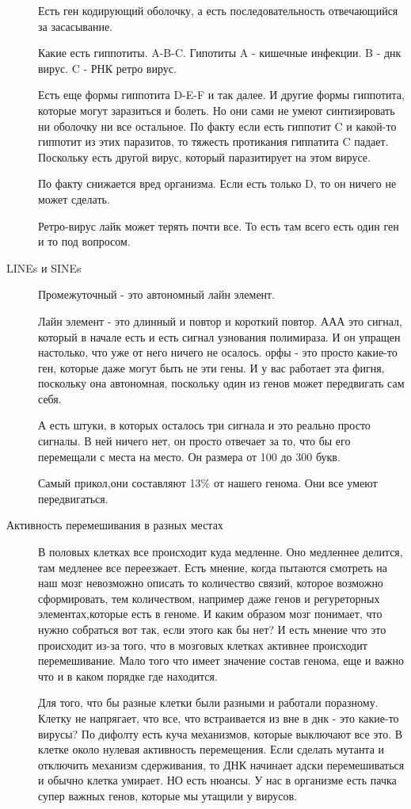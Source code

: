 \begin{description}
Есть ген кодирующий оболочку, а есть последовательность 
отвечающийся за засасывание. 


Какие есть гиппотиты. A-B-C. Гипотиты A - кишечные инфекции. B - днк вирус. C - РНК ретро вирус. 

Есть еще формы гиппотита D-E-F и так далее. И другие формы гиппотита, которые могут заразиться 
и болеть. Но они сами не умеют синтизировать ни оболочку ни все остальное. По факту если есть 
гиппотит C и какой-то гиппотит из этих паразитов, то тяжесть протикания гиппатита C падает. 
Поскольку есть другой вирус, который паразитирует на этом вирусе. 

По факту снижается вред организма. Если есть только D, то он ничего не может сделать. 

Ретро-вирус лайк может терять почти все. То есть там всего есть один ген и то 
под вопросом.

\item[LINEs и SINEs] 
Промежуточный - это автономный лайн элемент. 

Лайн элемент - это длинный и повтор
и короткий повтор. ААА это сигнал, который в начале
есть и есть сигнал узнования полимираза. И он упращен настолько,
что уже от него ничего не осалось. орфы - это просто какие-то
ген, которые даже могут быть не эти гены. И у вас работает эта фигня,
поскольку она автономная, поскольку один из генов может передвигать сам себя.

А есть штуки, в которых осталось три сигнала и это
реально просто сигналы. В ней ничего нет, он просто отвечает за то,
что бы его перемещали с места на место. Он размера от 100 до 300 букв.

Самый прикол,они составляют 13\% от нашего генома. Они все умеют передвигаться.

\item[Активность перемешивания в разных местах]
В половых клетках все происходит куда медленне. Оно медленнее делится, там медленее все переезжает.
Есть мнение, когда пытаются смотреть на наш мозг невозможно описать
то количество связий, которое возможно сформировать, тем количеством, например даже
генов и регуреторных элементах,которые есть в геноме. И каким образом мозг понимает,
что нужно собраться вот так, если этого как бы нет? И  есть мнение что это происходит
из-за того, что в мозговых клетках активнее происходит перемешивание.
Мало того что имеет значение состав генома, еще и важно что и в каком порядке где находится.

Для того, что бы разные клетки были разными и работали поразному. Клетку не напрягает, что 
все, что встраивается из вне в днк - это какие-то вирусы? По дифолту есть 
куча механизмов, которые выключают все это. В клетке около нулевая 
активность перемещения. Если сделать мутанта и отключить 
механизм сдерживания, то ДНК начинает адски перемешиваться 
и обычно клетка умирает. НО есть 
нюансы. У нас в организме есть 
пачка супер важных генов, которые мы утащили у вирусов. 


\end{description}
